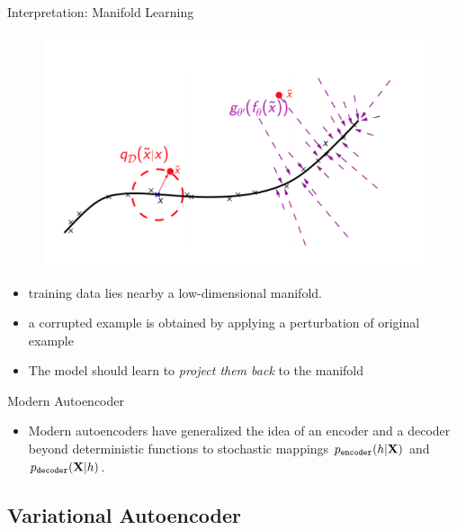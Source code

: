 \documentclass[xcolor=pdftex,dvipsnames,table,mathserif]{beamer}
\begin{document}
\begin{frame}{Interpretation: Manifold Learning}
\begin{figure}
\includegraphics[width=.5\columnwidth]{../graphics/Manifold}
\end{figure}
\begin{itemize}
\item training data lies nearby a low-dimensional manifold.
\item a corrupted example is obtained by applying a perturbation of original example
\item The model should learn to \emph{project them back} to the manifold
\end{itemize}
\end{frame}


\begin{frame}{Modern Autoencoder}
\begin{itemize}
\item Modern autoencoders have generalized the idea of an encoder and a decoder
beyond deterministic functions to stochastic mappings
$p_{\texttt{encoder}}(h|\mathbf{X})$ and $p_{\texttt{decoder}}(\mathbf{X}|h)$.
\end{itemize}
\end{frame}

\subsection{Variational Autoencoder}
\end{document}
